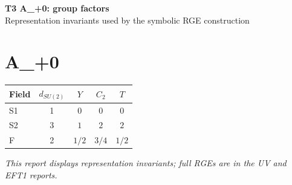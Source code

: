 \documentclass[10pt,a4paper]{article}
\begin{document}
\begin{center}
{\Large\bfseries T3 A\_+0: group factors}\\[4pt]
Representation invariants used by the symbolic RGE construction
\end{center}
\bigskip
\section*{A\_+0}
\begin{longtable}{@{}lcccc@{}}
\toprule Field & $d_{SU(2)}$ & $Y$ & $C_2$ & $T$ \\
\midrule
S1 & 1 & $0$ & $0$ & $0$ \\
S2 & 3 & $1$ & $2$ & $2$ \\
F & 2 & $1/2$ & $3/4$ & $1/2$ \\
\bottomrule
\end{longtable}
\emph{This report displays representation invariants; full RGEs are in the UV and EFT1 reports.}
\end{document}
